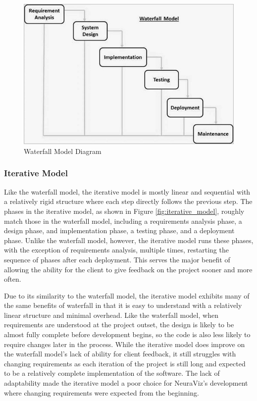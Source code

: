 \begin{figure}[htb]
    \centering
    \includegraphics[width=.75\textwidth]{02_dev_process/res/sdlc_waterfall_model.jpg}
    \caption[Waterfall Model Diagram]{Waterfall Model Diagram \cite{tutorialspointWaterfall}}
    \label{fig:waterfall_model}
\end{figure}

\subsubsection{Iterative Model}
Like the waterfall model, the iterative model is mostly linear and sequential with a relatively rigid structure where each step directly follows the previous step. The phases in the iterative model, as shown in Figure \ref{fig:iterative_model}, roughly match those in the waterfall model, including a requirements analysis phase, a design phase, and implementation phase, a testing phase, and a deployment phase. Unlike the waterfall model, however, the iterative model runs these phases, with the exception of requirements analysis, multiple times, restarting the sequence of phases after each deployment. This serves the major benefit of allowing the ability for the client to give feedback on the project sooner and more often.

Due to its similarity to the waterfall model, the iterative model exhibits many of the same benefits of waterfall in that it is easy to understand with a relatively linear structure and minimal overhead. Like the waterfall model, when requirements are understood at the project outset, the design is likely to be almost fully complete before development begins, so the code is also less likely to require changes later in the process. While the iterative model does improve on the waterfall model's lack of ability for client feedback, it still struggles with changing requirements as each iteration of the project is still long and expected to be a relatively complete implementation of the software. The lack of adaptability made the iterative model a poor choice for NeuraViz's development where changing requirements were expected from the beginning.

